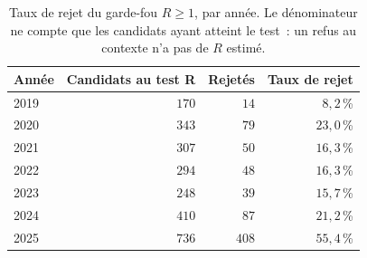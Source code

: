 \begin{table}[htbp]
\centering
\small
\caption{Taux de rejet du garde-fou $R \geq 1$, par année. Le dénominateur ne compte que les candidats ayant atteint le test~: un refus au contexte n'a pas de $R$ estimé.}
\label{tab:x10_r_rule}
\begin{tabular}{l r r r}
\toprule
\textbf{Année} & \textbf{Candidats au test R} & \textbf{Rejetés} & \textbf{Taux de rejet} \\
\midrule
2019 & $170$ & $14$ & $8{,}2$\,\% \\
2020 & $343$ & $79$ & $23{,}0$\,\% \\
2021 & $307$ & $50$ & $16{,}3$\,\% \\
2022 & $294$ & $48$ & $16{,}3$\,\% \\
2023 & $248$ & $39$ & $15{,}7$\,\% \\
2024 & $410$ & $87$ & $21{,}2$\,\% \\
2025 & $736$ & $408$ & $55{,}4$\,\% \\
\bottomrule
\end{tabular}
\end{table}
